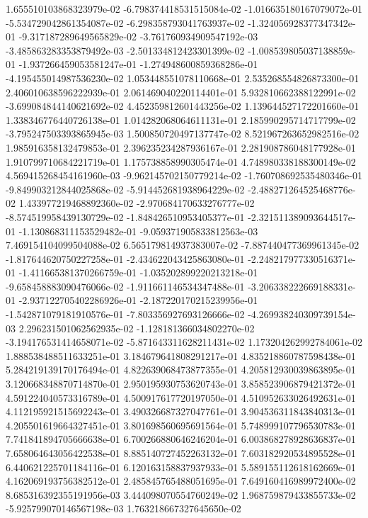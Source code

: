 1.655510103868323979e-02
-6.798374418531515084e-02
-1.016635180167079072e-01
-5.534729042861354087e-02
-6.298358793041763937e-02
-1.324056928377347342e-01
-9.317187289649565829e-02
-3.761760934909547192e-03
-3.485863283353879492e-03
-2.501334812423301399e-02
-1.008539805037138859e-01
-1.937266459053581247e-01
-1.274948600859368286e-01
-4.195455014987536230e-02
1.053448551078110668e-01
2.535268554826873300e-01
2.406010638596222939e-01
2.061469040220114401e-01
5.932810662388122991e-02
-3.699084844140621692e-02
4.452359812601443256e-02
1.139644527172201660e-01
1.338346776440726138e-01
1.014282068064611131e-01
2.185990295714717799e-02
-3.795247503393865945e-03
1.500850720497137747e-02
8.521967263652982516e-02
1.985916358132479853e-01
2.396235234287936167e-01
2.281908786048177928e-01
1.910799710684221719e-01
1.175738858990305474e-01
4.748980338188300149e-02
4.569415268454161960e-03
-9.962145702150779214e-02
-1.760708692535480346e-01
-9.849903212844025868e-02
-5.914452681938964229e-02
-2.488271264525468776e-02
1.433977219468892360e-02
-2.970684170633276777e-02
-8.574519958439130729e-02
-1.848426510953405377e-01
-2.321511389093644517e-01
-1.130868311153529482e-01
-9.059371905833812563e-03
7.469154104099504088e-02
6.565179814937383007e-02
-7.887440477369961345e-02
-1.817644620750227258e-01
-2.434622043425863080e-01
-2.248217977330516371e-01
-1.411665381370266759e-01
-1.035202899220213218e-01
-9.658458883090476066e-02
-1.911661146534347488e-01
-3.206338222669188331e-01
-2.937122705402286926e-01
-2.187220170215239956e-01
-1.542871079181910576e-01
-7.803356927693126666e-02
-4.269938240309739154e-03
2.296231501062562935e-02
-1.128181366034802270e-02
-3.194176531414658071e-02
-5.871643311628211431e-02
1.173204262992784061e-02
1.888538488511633251e-01
3.184679641808291217e-01
4.835218860787598438e-01
5.284219139170176494e-01
4.822639068473877355e-01
4.205812930039863895e-01
3.120668348870714870e-01
2.950195930753620743e-01
3.858523906879421372e-01
4.591224040573316789e-01
4.500917617720197050e-01
4.510952633026492631e-01
4.112195921515692243e-01
3.490326687327047761e-01
3.904536311843840313e-01
4.205501619664327451e-01
3.801698560695691564e-01
5.748999107796530783e-01
7.741841894705666638e-01
6.700266880646246204e-01
6.003868278928636837e-01
7.658064643056422538e-01
8.885140727452263132e-01
7.603182920534895528e-01
6.440621225701184116e-01
6.120163158837937933e-01
5.589155112618162669e-01
4.162069193756382512e-01
2.485845765488051695e-01
7.649160416989972400e-02
8.685316392355191956e-03
3.444098070554760249e-02
1.968759879433855733e-02
-5.925799070146567198e-03
1.763218667327645650e-02

